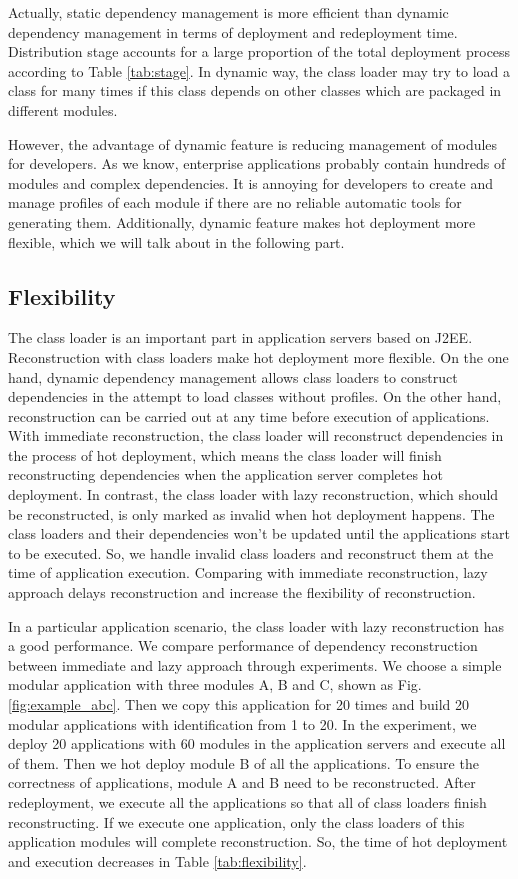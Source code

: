 \documentclass[conference]{IEEEtran}
\begin{document}
Actually, static dependency management is more efficient than dynamic dependency management in terms of deployment and redeployment time.
Distribution stage accounts for a large proportion of the total deployment process according to Table \ref{tab:stage}.
In dynamic way, the class loader may try to load a class for many times if this class depends on other classes which are packaged in different modules.

However, the advantage of dynamic feature is reducing management of modules for developers.
As we know, enterprise applications probably contain hundreds of modules and complex dependencies.
It is annoying for developers to create and manage profiles of each module if there are no reliable automatic tools for generating them.
Additionally, dynamic feature makes hot deployment more flexible, which we will talk about in the following part.


\subsection{Flexibility}

The class loader is an important part in application servers based on J2EE.
Reconstruction with class loaders make hot deployment more flexible.
On the one hand, dynamic dependency management allows class loaders to construct dependencies in the attempt to load classes without profiles.
On the other hand, reconstruction can be carried out at any time before execution of applications.
With immediate reconstruction, the class loader will reconstruct dependencies in the process of hot deployment, which means the class loader will finish reconstructing dependencies when the application server completes hot deployment.
In contrast, the class loader with lazy reconstruction, which should be reconstructed, is only marked as invalid when hot deployment happens.
The class loaders and their dependencies won't be updated until the applications start to be executed.
So, we handle invalid class loaders and reconstruct them at the time of application execution.
Comparing with immediate reconstruction, lazy approach delays reconstruction and increase the flexibility of reconstruction.

In a particular application scenario, the class loader with lazy reconstruction has a good performance. 
We compare performance of dependency reconstruction between immediate and lazy approach through experiments.
We choose a simple modular application with three modules A, B and C, shown as Fig. \ref{fig:example_abc}.
Then we copy this application for 20 times and build 20 modular applications with identification from 1 to 20.
In the experiment, we deploy 20 applications with 60 modules in the application servers and execute all of them.
Then we hot deploy module B of all the applications.
To ensure the correctness of applications, module A and B need to be reconstructed.
After redeployment, we execute all the applications so that all of class loaders finish reconstructing.
If we execute one application, only the class loaders of this application modules will complete reconstruction.
So, the time of hot deployment and execution decreases in Table \ref{tab:flexibility}. 
\end{document}
